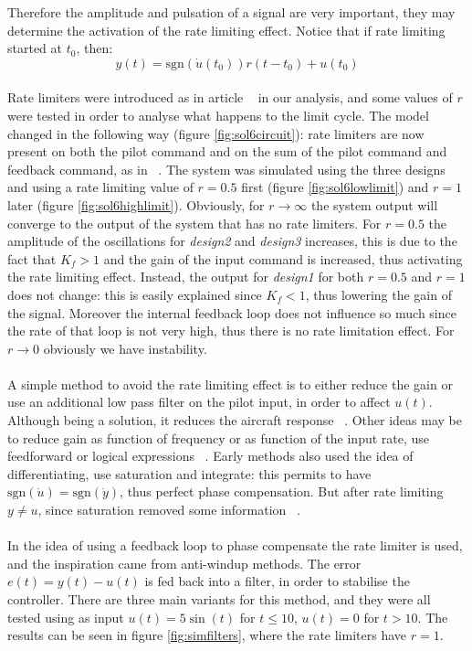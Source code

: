  Therefore the amplitude and pulsation of a signal are very important, they may determine the activation of the rate limiting effect. Notice that if rate limiting started at $t_0$, then: $$y(t) = \textrm{sgn}(\dot{u}(t_0)) r(t-t_0)+u(t_0)$$\\
Rate limiters were introduced as in article ~\cite[p. 3947]{paper3} in our analysis, and some values of $r$ were tested in order to analyse what happens to the limit cycle. The model changed in the following way (figure \ref{fig:sol6circuit}): rate limiters are now present on both the pilot command and on the sum of the pilot command and feedback command, as in ~\cite[p. 3947]{paper3}. The system was simulated using the three designs and using a rate limiting value of $r=0.5$ first (figure \ref{fig:sol6lowlimit}) and $r=1$ later (figure \ref{fig:sol6highlimit}). Obviously, for $r \to \infty$ the system output will converge to the output of the system that has no rate limiters. For $r=0.5$ the amplitude of the oscillations for \emph{design2} and \emph{design3}  increases, this is due to the fact that $K_f>1$ and the gain of the input command is increased, thus activating the rate limiting effect. Instead, the output for \emph{design1} for both $r=0.5$ and $r=1$ does not change: this is easily explained since $K_f<1$, thus lowering the gain of the signal. Moreover the internal feedback loop does not influence so much since the rate of that loop is not very high, thus there is no  rate limitation effect. For $r \to 0$ obviously we have instability.
\\ \\
A simple method to avoid the rate limiting effect is to either  reduce the gain or use an additional low pass filter on the pilot input, in order to affect $u(t)$. Although being a solution, it reduces the aircraft response ~\cite[p. 3944]{paper3}. Other ideas may be to reduce gain as function of frequency or as function of the input rate, use feedforward or logical expressions ~\cite[p. 20]{paper4}. Early methods also used the idea of differentiating, use saturation and integrate: this permits to have $\textrm{sgn}(\dot{u})=\textrm{sgn}(\dot{y})$, thus perfect phase compensation. But after rate limiting $y \neq u$, since  saturation removed some information ~\cite[p. 20]{paper4}. \\ \\
In \cite{paper3} the idea of using a feedback loop to phase compensate the rate limiter is used, and the inspiration came from anti-windup methods. The error $e(t)=y(t)-u(t)$ is fed back into a filter, in order to stabilise the controller. There are three main variants for this method, and they were all tested using as input $u(t)=5\sin(t)$ for $t \leq 10$, $u(t)=0$ for $t>10$. The results can be seen in figure \ref{fig:simfilters}, where the rate limiters have $r=1$.\\
